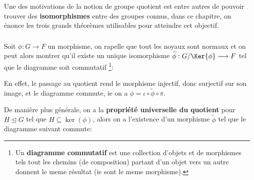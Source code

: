 \chapter*{}
Une des motivations de la notion de groupe quotient est entre autres de pouvoir trouver des \textbf{isomorphismes} entre des groupes connus, dans ce chapitre, on énonce les trois grands théorèmes utilisables pour atteindre cet objectif.

\subsection*{}
Soit \(\phi : G \longrightarrow F\) un morphisme, on rapelle que tout les noyaux sont normaux et on peut alors montrer qu'il existe un unique isomorphisme \(\widetilde{\phi} : G/\Ker{\phi} \longrightarrow F\) tel que le diagramme soit commutatif \footnote[1]{Un \textbf{diagramme commutatif} est une collection d'objets et de morphismes tels tout les chemins (de composition) partant d'un objet vers un autre donnent le meme résultat (ie sont le meme morphisme).}:
\begin{center}
\end{center}
En effet, le passage au quotient rend le morphisme injectif, donc surjectif sur son image, et le diagramme commute, ie on a \( \phi = \iota \circ \widetilde{ \phi} \circ \pi \).\<

De manière plus générale, on a la \textbf{propriété universelle du quotient} pour \( H \unlhd G \) tel que \( H \subseteq \ker(\phi) \), alors on a l'existence d'un morphisme \( \widetilde{\phi} \) tel que le diagramme suivant commute:
\begin{center}
\end{center}
